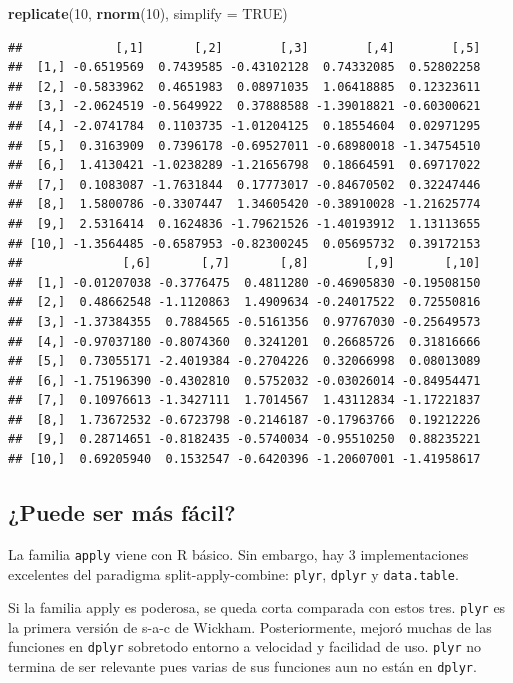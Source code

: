 \documentclass[]{article}
\newenvironment{Shaded}{\begin{snugshade}}{\end{snugshade}}
\newcommand{\KeywordTok}[1]{\textcolor[rgb]{0.13,0.29,0.53}{\textbf{{#1}}}}
\newcommand{\DataTypeTok}[1]{\textcolor[rgb]{0.13,0.29,0.53}{{#1}}}
\newcommand{\DecValTok}[1]{\textcolor[rgb]{0.00,0.00,0.81}{{#1}}}
\newcommand{\OtherTok}[1]{\textcolor[rgb]{0.56,0.35,0.01}{{#1}}}
\newcommand{\NormalTok}[1]{{#1}}
\begin{document}
\begin{Shaded}
\begin{Highlighting}[]
\KeywordTok{replicate}\NormalTok{(}\DecValTok{10}\NormalTok{, }\KeywordTok{rnorm}\NormalTok{(}\DecValTok{10}\NormalTok{), }\DataTypeTok{simplify =} \OtherTok{TRUE}\NormalTok{)}
\end{Highlighting}
\end{Shaded}

\begin{verbatim}
##             [,1]       [,2]        [,3]        [,4]        [,5]
##  [1,] -0.6519569  0.7439585 -0.43102128  0.74332085  0.52802258
##  [2,] -0.5833962  0.4651983  0.08971035  1.06418885  0.12323611
##  [3,] -2.0624519 -0.5649922  0.37888588 -1.39018821 -0.60300621
##  [4,] -2.0741784  0.1103735 -1.01204125  0.18554604  0.02971295
##  [5,]  0.3163909  0.7396178 -0.69527011 -0.68980018 -1.34754510
##  [6,]  1.4130421 -1.0238289 -1.21656798  0.18664591  0.69717022
##  [7,]  0.1083087 -1.7631844  0.17773017 -0.84670502  0.32247446
##  [8,]  1.5800786 -0.3307447  1.34605420 -0.38910028 -1.21625774
##  [9,]  2.5316414  0.1624836 -1.79621526 -1.40193912  1.13113655
## [10,] -1.3564485 -0.6587953 -0.82300245  0.05695732  0.39172153
##              [,6]       [,7]       [,8]        [,9]       [,10]
##  [1,] -0.01207038 -0.3776475  0.4811280 -0.46905830 -0.19508150
##  [2,]  0.48662548 -1.1120863  1.4909634 -0.24017522  0.72550816
##  [3,] -1.37384355  0.7884565 -0.5161356  0.97767030 -0.25649573
##  [4,] -0.97037180 -0.8074360  0.3241201  0.26685726  0.31816666
##  [5,]  0.73055171 -2.4019384 -0.2704226  0.32066998  0.08013089
##  [6,] -1.75196390 -0.4302810  0.5752032 -0.03026014 -0.84954471
##  [7,]  0.10976613 -1.3427111  1.7014567  1.43112834 -1.17221837
##  [8,]  1.73672532 -0.6723798 -0.2146187 -0.17963766  0.19212226
##  [9,]  0.28714651 -0.8182435 -0.5740034 -0.95510250  0.88235221
## [10,]  0.69205940  0.1532547 -0.6420396 -1.20607001 -1.41958617
\end{verbatim}

\subsection{¿Puede ser más fácil?}\label{puede-ser-mas-facil}

La familia \texttt{apply} viene con R básico. Sin embargo, hay 3
implementaciones excelentes del paradigma split-apply-combine:
\texttt{plyr}, \texttt{dplyr} y \texttt{data.table}.

Si la familia apply es poderosa, se queda corta comparada con estos
tres. \texttt{plyr} es la primera versión de s-a-c de Wickham.
Posteriormente, mejoró muchas de las funciones en \texttt{dplyr}
sobretodo entorno a velocidad y facilidad de uso. \texttt{plyr} no
termina de ser relevante pues varias de sus funciones aun no están en
\texttt{dplyr}.
\end{document}
